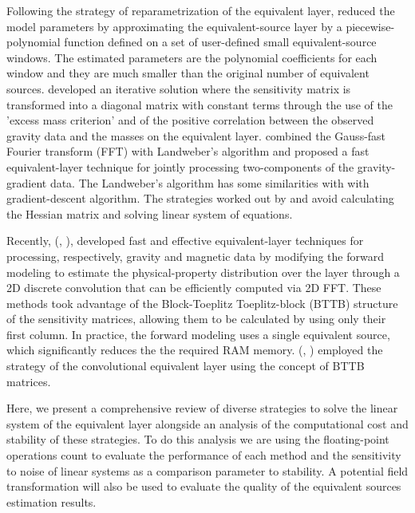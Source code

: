 Following the strategy of reparametrization of the equivalent layer, \cite{oliveirajr-etal2013} reduced the model parameters by approximating the equivalent-source layer by a piecewise-polynomial function defined on a set of user-defined small equivalent-source windows. The estimated parameters are the polynomial coefficients for each window and they are much smaller than the original number of equivalent sources. \cite{siqueira-etal2017} developed an iterative solution where the sensitivity matrix is transformed into a diagonal matrix with constant terms through the use of the 'excess mass criterion' and of the positive correlation between the observed gravity data and the masses on the equivalent layer. \cite{jirigalatu-ebbing2019} combined the Gauss-fast Fourier transform (FFT) with Landweber's algorithm and proposed a fast equivalent-layer technique for jointly processing two-components of the gravity-gradient data.
The Landweber's algorithm has some similarities with with gradient-descent algorithm. The strategies worked out by \cite{siqueira-etal2017} and \cite{jirigalatu-ebbing2019} avoid calculating the Hessian matrix and solving linear system of equations.

Recently, \citeauthor{takahashi2020} (\citeyear{takahashi2020}, \citeyear{takahashi2022}), developed fast and effective equivalent-layer techniques for processing, respectively,  gravity and magnetic data by modifying the forward modeling to estimate the physical-property distribution  over the layer through a 2D discrete convolution that can be efficiently computed via 2D FFT.
These methods took advantage of the Block-Toeplitz Toeplitz-block (BTTB) structure of the sensitivity matrices, allowing them to be calculated by using only their first column.
In practice, the forward modeling uses a single equivalent source, which significantly reduces the the required RAM memory. \citeauthor{takahashi2020} (\citeyear{takahashi2020}, \citeyear{takahashi2022}) employed the strategy of the convolutional equivalent layer using the concept of  BTTB matrices.

Here, we present a comprehensive review of diverse strategies to solve the linear system of the equivalent layer alongside an analysis of the computational cost and stability of these strategies.
To do this analysis we are using the floating-point operations count to evaluate the performance of each method and the sensitivity to noise of linear systems as a comparison parameter to stability. A potential field transformation will also be used to evaluate the quality of the equivalent sources estimation results.